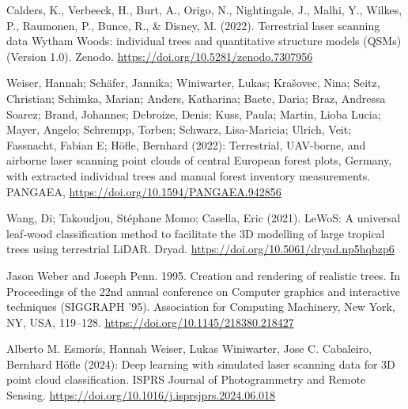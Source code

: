 \documentclass[]{article}
\begin{document}
	
	\begin{thebibliography}{biblio}
		 Calders, K., Verbeeck, H., Burt, A., Origo, N., Nightingale, J., Malhi, Y., Wilkes, P., Raumonen, P., Bunce, R., \& Disney, M. (2022). Terrestrial laser scanning data Wytham Woods: individual trees and quantitative structure models (QSMs) (Version 1.0). Zenodo. \mbox{\url{https://doi.org/10.5281/zenodo.7307956}}
		
		 Weiser, Hannah; Schäfer, Jannika; Winiwarter, Lukas; Krašovec, Nina; Seitz, Christian; Schimka, Marian; Anders, Katharina; Baete, Daria; Braz, Andressa Soarez; Brand, Johannes; Debroize, Denis; Kuss, Paula; Martin, Lioba Lucia; Mayer, Angelo; Schrempp, Torben; Schwarz, Lisa-Maricia; Ulrich, Veit; Fassnacht, Fabian E; Höfle, Bernhard (2022): Terrestrial, UAV-borne, and airborne laser scanning point clouds of central European forest plots, Germany, with extracted individual trees and manual forest inventory measurements. PANGAEA, \mbox{\url{https://doi.org/10.1594/PANGAEA.942856}}
		
		 Wang, Di; Takoudjou, Stéphane Momo; Casella, Eric (2021). LeWoS: A universal leaf‐wood classification method to facilitate the 3D modelling of large tropical trees using terrestrial LiDAR. Dryad. \mbox{\url{https://doi.org/10.5061/dryad.np5hqbzp6}}
		
		 Jason Weber and Joseph Penn. 1995. Creation and rendering of realistic trees. In Proceedings of the 22nd annual conference on Computer graphics and interactive techniques (SIGGRAPH '95). Association for Computing Machinery, New York, NY, USA, 119–128. \mbox{\url{https://doi.org/10.1145/218380.218427}}
		
		 Alberto M. Esmorís, Hannah Weiser, Lukas Winiwarter, Jose C. Cabaleiro, Bernhard Höfle (2024): Deep learning with simulated laser scanning data for 3D point cloud classification. ISPRS Journal of Photogrammetry and Remote Sensing. \mbox{\url{https://doi.org/10.1016/j.isprsjprs.2024.06.018}}
	\end{thebibliography}
\end{document}
